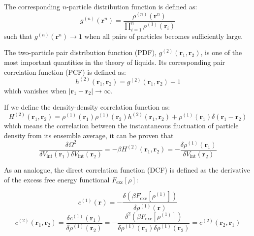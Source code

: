 The corresponding $n$-particle distribution function is defined as:
\begin{equation}
g^{(n)}(\mathbf{r}^{n})=\dfrac{\rho^{(n)}(\mathbf{r}^{n})}{\prod_{i=1}^{n}\rho^{(1)}(\mathbf{r}_{i})}
\end{equation}
such that $g^{(n)}(\mathbf{r}^{n})\rightarrow1$ when all pairs of
particles becomes sufficiently large.

The two-particle pair distribution function (\acs{PDF}), $g^{(2)}(\mathbf{r}_{1},\mathbf{r}_{2})$,
is one of the most important quantities in the theory of liquids.
Its corresponding pair correlation function (\acs{PCF}) is defined
as:
\begin{equation}
h^{(2)}(\mathbf{r}_{1},\mathbf{r}_{2})=g^{(2)}(\mathbf{r}_{1},\mathbf{r}_{2})-1
\end{equation}
which vanishes when $\left|\mathbf{r}_{1}-\mathbf{r}_{2}\right|\rightarrow\infty$.

If we define the density-density correlation function as: 
\begin{equation}
H^{(2)}(\mathbf{r}_{1},\mathbf{r}_{2})=\rho^{(1)}(\mathbf{r}_{1})\rho^{(1)}(\mathbf{r}_{2})h^{(2)}(\mathbf{r}_{1},\mathbf{r}_{2})+\rho^{(1)}(\mathbf{r}_{1})\delta(\mathbf{r}_{1}-\mathbf{r}_{2})\label{eq:H-definition}
\end{equation}
which means the correlation \citep{Correlation_function_wiki} between
the instantaneous fluctuation of particle density from its ensemble
average, it can be proven that
\begin{equation}
\dfrac{\delta\varOmega^{2}}{\delta V_{\mathrm{int}}(\mathbf{r}_{1})\delta V_{\mathrm{int}}(\mathbf{r}_{2})}=-\beta H^{(2)}(\mathbf{r}_{1},\mathbf{r}_{2})=-\dfrac{\delta\rho^{(1)}(\mathbf{r}_{1})}{\delta V_{\mathrm{int}}(\mathbf{r}_{2})}
\end{equation}

As an analogue, the direct correlation function (\acs{DCF}) is defined
as the derivative of the excess free energy functional $F_{\mathrm{exc}}[\rho]$:

\begin{equation}
c^{(1)}(\mathbf{r})=-\dfrac{\delta(\beta F_{\mathrm{exc}}[\rho^{(1)}])}{\delta\rho^{(1)}(\mathbf{r})}
\end{equation}
\begin{equation}
c^{(2)}(\mathbf{r}_{1},\mathbf{r}_{2})=\dfrac{\delta c^{(1)}(\mathbf{r}_{1})}{\delta\rho^{(1)}(\mathbf{r}_{2})}=-\dfrac{\delta^{2}(\beta F_{\mathrm{exc}}[\rho^{(1)}])}{\delta\rho^{(1)}(\mathbf{r}_{1})\delta\rho^{(1)}(\mathbf{r}_{2})}=c^{(2)}(\mathbf{r}_{2},\mathbf{r}_{1})
\end{equation}

